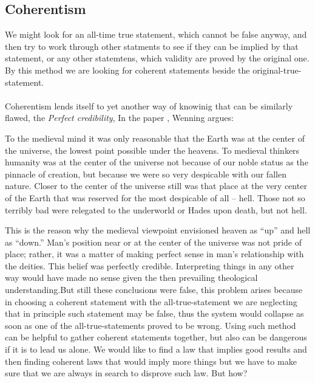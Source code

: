 \documentclass[10pt,a4paper]{article}
\newcounter{theo}
\begin{document}
                \subsection{Coherentism}
                 We might look for an all-time true statement, which cannot be false anyway, and then try to work through other statments to see if they can be implied by that statement, or any other statemtens, which validity are proved by the original one. By this method we are looking for coherent statements beside the original-true-statement. 
                \\
                \\
                Coherentism lends itself to yet another way of knowinig that can be similarly flawed, the \textit{Perfect credibility}, In the paper \cite{CW/E}, Wenning argues:
                \begin{qt}
                    To the medieval mind it was only reasonable that the Earth was at the center of the universe, the lowest point possible under the heavens. To medieval thinkers humanity was at the center of the universe not because of our noble status as the pinnacle of creation, but because we were so very despicable with our fallen nature. Closer to the center of the universe still was that place at the very center of the Earth that was reserved for the most despicable of all – hell. Those not so terribly bad were relegated to the underworld or Hades upon death, but not hell.
                \end{qt}
                This is the reason why the medieval viewpoint envisioned heaven as “up” and hell as “down.” Man’s position near or at the center of the universe was not pride of place; rather, it was a matter of making perfect sense in man’s relationship with the deities. This belief was perfectly credible. Interpreting things in any other way would have made no sense given the then prevailing theological understanding.But still these conclusions were false, this problem arises because in choosing a coherent statement with the all-true-statement we are neglecting that in principle such statement may be false, thus the system would collapse as soon as one of the all-true-statements proved to be wrong. Using such method can be helpful to gather coherent statements together, but also can be dangerous if it is to lead us alone. We would like to find a law that implies good results and then finding coherent laws that would imply more things but we have to make sure that we are always in search to disprove such law. But how?
                
\end{document}
